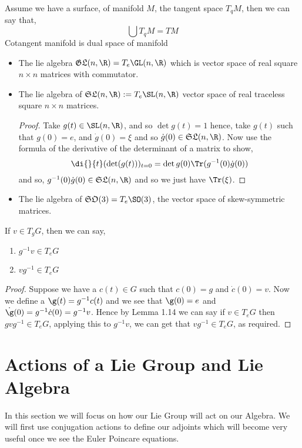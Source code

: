 
\noindent
Assume we have a surface, of manifold $M$, the tangent space $T_qM$, then we can say that,
$$ \bigcup T_qM = TM $$
Cotangent manifold is dual space of manifold\\

\begin{eg}
  \begin{itemize}
    \item The lie algebra $\mathfrak{GL}(n, \R) = T_e\GL(n, \R)$ which is vector space of real square $n \times n$ matrices with commutator.
    \item The lie algebra of $\mathfrak{SL}(n, \R) := T_e \SL(n, \R)$ vector space of real traceless square $n \times n$ matrices.
    \begin{proof}
      Take $g(t) \in \SL(n, \R)$, and so $\det g(t) = 1$ hence, take $g(t)$ such that $g(0) = e$, and $\dot g(0) = \xi$ and so $\dot g(0) \in \mathfrak{SL}(n, \R)$. Now use the formula of the derivative of the determinant of a matrix to show,
      $$ \di {}{t} (\det (g(t)))_{t=0} = \det {g(0)}\Tr(g^{-1}(0)\dot g(0)) $$
      and so, $g^{-1}(0)\dot g(0) \in \mathfrak{SL}(n, \R)$ and so we just have $\Tr (\xi)$.
    \end{proof}
    \item The lie algebra of $\mathfrak{SO}(3) = T_e\SO(3)$, the vector space of skew-symmetric matrices.
  \end{itemize}
\end{eg}

\begin{nlemma}
  If $v \in T_gG$, then we can say,
  \begin{enumerate}
    \item $g^{-1}v \in T_eG$
    \item $vg^{-1} \in T_eG$
  \end{enumerate}
\end{nlemma}
{\color{red} \begin{proof}
  Suppose we have a $c(t) \in G$ such that $c(0) = g$ and $\dot c(0) = v$. Now we define a $\g(t) = g^{-1}c(t)$ and we see that $\g (0) = e$ and $\dot\g(0) = g^{-1}\dot c(0) = g^{-1}v$. Hence by Lemma 1.14 we can say if $v \in T_eG$ then $gvg^{-1} \in T_eG$, applying this to $g^{-1}v$, we can get that $vg^{-1} \in T_eG$, as required.
\end{proof} }

\section{Actions of a Lie Group and Lie Algebra}
In this section we will focus on how our Lie Group will act on our Algebra. We will first use conjugation actions to define our adjoints which will become very useful once we see the Euler Poincare equations.


